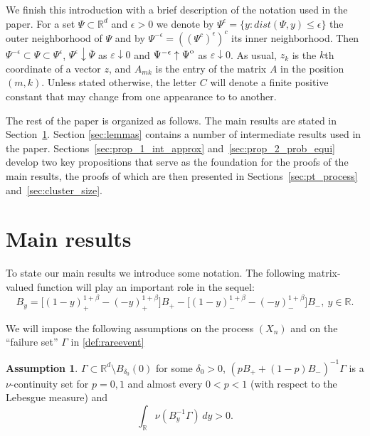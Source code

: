 \documentclass[11pt,reqno]{amsart}
\numberwithin{equation}{section}
\theoremstyle{definition}
\newtheorem{assumption}{Assumption}[section] %
\theoremstyle{remark}
\theoremstyle{definition}
\newcommand{\eps}{\varepsilon}
\newcommand{\R}{\mathbb{R}}
\newcommand{\RR}{\mathbb{R}}
\newcommand{\interior}[1]{%
  {\kern0pt#1}^{\mathrm{o}}%
}
\begin{document}
We finish this introduction with a brief description of the notation
used in the paper. For a set $\Psi\subset\RR^d$ and $\epsilon>0$ we
denote by  $\Psi^\epsilon = \{y: dist(\Psi, y) \leq \epsilon\}$ 
 the outer neighborhood of $\Psi$ and by $\Psi^{-\epsilon} = ((\Psi^c)^\epsilon)^c$
its inner neighborhood. Then 
    $\Psi^{-\epsilon} \subset \Psi \subset \Psi^{\epsilon}$, 
  $\Psi^{\epsilon} \downarrow \bar{\Psi}$ as $\eps \downarrow 0$
  and  $\Psi^{-\epsilon} \uparrow \interior{\Psi}$ as $\eps
  \downarrow 0$. As usual, $z_k$ is the $k$th coordinate of a vector
  $z$, and $A_{mk}$ is the entry of the matrix $A$ in the position
  $(m,k)$. Unless stated otherwise, the letter $C$ will denote a
  finite positive constant that may change from one appearance to to
  another. 

The rest of the paper is organized as follows. 
The main results are stated in Section~\ref{sec:main_result}. Section
\ref{sec:lemmas} contains a number of intermediate results used in the
paper. 
Sections~\ref{sec:prop_1_int_approx} and~\ref{sec:prop_2_prob_equi}
develop two key propositions that serve as the foundation for the
proofs of the main results, the proofs of which are then presented in Sections~\ref{sec:pt_process} and~\ref{sec:cluster_size}. 

\section{Main results}\label{sec:main_result}


To state our main results we introduce some notation. The following
matrix-valued function will play an important role in the sequel: 
\begin{equation}\label{eq:def_coeff_matrix}
    B_y = \big[(1-y)_+^{1+\beta} - (-y)_+^{1+\beta}\big] B_+ 
        - \big[(1-y)_-^{1+\beta} - (-y)_-^{1+\beta}\big] B_- , \ y\in\R.
\end{equation}

We will impose the following assumptions on the process $(X_n)$ and on
the ``failure set'' $\Gamma$ in \eqref{def:rareevent}
\begin{assumption}\label{ass:tail_measure}
$\Gamma \subset \RR^d \setminus
B_{\delta_0}(0)$ for some $\delta_0>0$,  $(pB_++(1-p)B_-)^{-1}\Gamma$ is a
$\nu$-continuity set for $p=0,1$ and almost every $0< p< 1$ (with respect to
the Lebesgue measure) and
$$
\int_\R \nu ( B_y^{-1}\Gamma)\, dy>0. 
$$
\end{assumption}
\end{document}
